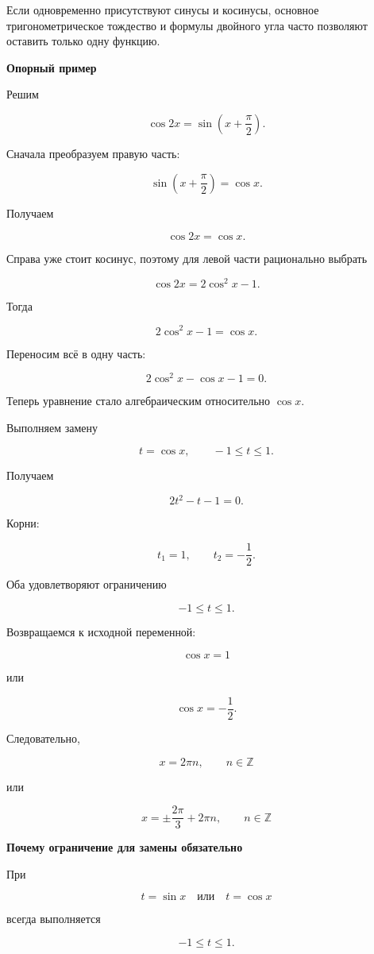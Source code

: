 \documentclass[a4paper,12pt]{article}
\newcommand{\subheading}[1]{%
  \vspace{0.7em}
  {\large\bfseries\color{darkaccent}#1\par}
  \vspace{0.25em}
}
\begin{document}
Если одновременно присутствуют синусы и косинусы,
основное тригонометрическое тождество и формулы двойного угла
часто позволяют оставить только одну функцию.

\subheading{Опорный пример}

Решим

\[
\cos2x
=
\sin\left(x+\frac{\pi}{2}\right).
\]

Сначала преобразуем правую часть:

\[
\sin\left(x+\frac{\pi}{2}\right)=\cos x.
\]

Получаем

\[
\cos2x=\cos x.
\]

Справа уже стоит косинус, поэтому для левой части рационально выбрать

\[
\cos2x=2\cos^2x-1.
\]

Тогда

\[
2\cos^2x-1=\cos x.
\]

Переносим всё в одну часть:

\[
2\cos^2x-\cos x-1=0.
\]

Теперь уравнение стало алгебраическим относительно \(\cos x\).

Выполняем замену

\[
t=\cos x,
\qquad
-1\le t\le1.
\]

Получаем

\[
2t^2-t-1=0.
\]

Корни:

\[
t_1=1,
\qquad
t_2=-\frac12.
\]

Оба удовлетворяют ограничению

\[
-1\le t\le1.
\]

Возвращаемся к исходной переменной:

\[
\cos x=1
\]

или

\[
\cos x=-\frac12.
\]

Следовательно,

\[
\boxed{
x=2\pi n,\qquad n\in\mathbb Z
}
\]

или

\[
\boxed{
x=\pm\frac{2\pi}{3}+2\pi n,
\qquad n\in\mathbb Z
}
\]

\subheading{Почему ограничение для замены обязательно}

При

\[
t=\sin x
\quad\text{или}\quad
t=\cos x
\]

всегда выполняется

\[
\boxed{-1\le t\le1}.
\]
\end{document}
